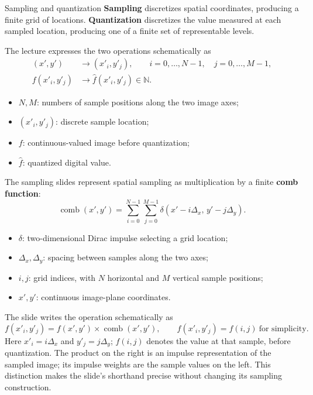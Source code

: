 \documentclass[11pt,a4paper,oneside]{report}
\newcommand{\mathlegend}[1]{%
  \par\vspace{0.2em}{\small\itshape where}\par
  \begin{itemize}[leftmargin=1.7em,topsep=0.15em,itemsep=0.12em]
  #1
  \end{itemize}
}
\begin{document}
\begin{definitionbox}{Sampling and quantization}
\textbf{Sampling} discretizes spatial coordinates, producing a finite grid of locations. \textbf{Quantization} discretizes the value measured at each sampled location, producing one of a finite set of representable levels.
\end{definitionbox}

The lecture expresses the two operations schematically as
\begin{align}
 (x',y') &\longrightarrow (x'_i,y'_j), \qquad i=0,\ldots,N-1,\quad j=0,\ldots,M-1, \label{eq:sampling-grid}\\
 f(x'_i,y'_j) &\longrightarrow \hat f(x'_i,y'_j)\in\mathbb{N}. \label{eq:quantization-map}
\end{align}
\mathlegend{
  \item $N,M$: numbers of sample positions along the two image axes;
  \item $(x'_i,y'_j)$: discrete sample location;
  \item $f$: continuous-valued image before quantization;
  \item $\hat f$: quantized digital value.
}


The sampling slides represent spatial sampling as multiplication by a finite \textbf{comb function}:
\begin{equation}
\operatorname{comb}(x',y')=
\sum_{i=0}^{N-1}\sum_{j=0}^{M-1}
\delta(x'-i\Delta_x,\,y'-j\Delta_y).
\label{eq:sampling-comb}
\end{equation}
\mathlegend{
\item $\delta$: two-dimensional Dirac impulse selecting a grid location;
\item $\Delta_x,\Delta_y$: spacing between samples along the two axes;
\item $i,j$: grid indices, with $N$ horizontal and $M$ vertical sample positions;
\item $x',y'$: continuous image-plane coordinates.}
The slide writes the operation schematically as
\begin{equation}
 f(x'_i,y'_j)=f(x',y')\times\operatorname{comb}(x',y'),
 \qquad f(x'_i,y'_j)=f(i,j)\ \text{for simplicity}.
\label{eq:comb-source}
\end{equation}
Here $x'_i=i\Delta_x$ and $y'_j=j\Delta_y$; $f(i,j)$ denotes the value at that sample, before quantization. The product on the right is an impulse representation of the sampled image; its impulse weights are the sample values on the left. This distinction makes the slide's shorthand precise without changing its sampling construction.
\end{document}
